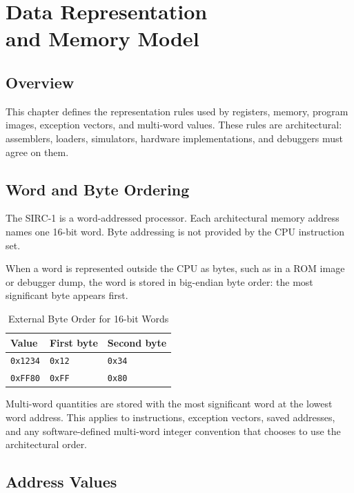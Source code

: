 \chapter[Data Representation and Memory Model]{Data Representation\\and Memory Model}
\label{ch:data-representation}

\section{Overview}

This chapter defines the representation rules used by registers, memory, program images, exception vectors, and
multi-word values. These rules are architectural: assemblers, loaders, simulators, hardware implementations, and
debuggers must agree on them.

\section{Word and Byte Ordering}

The SIRC-1 is a word-addressed processor. Each architectural memory address names one 16-bit word. Byte addressing is
not provided by the CPU instruction set.

When a word is represented outside the CPU as bytes, such as in a ROM image or debugger dump, the word is stored in
big-endian byte order: the most significant byte appears first.

\begin{table}[H]
	\centering
	\begin{tabular}{lll}
		\toprule
		\textbf{Value}  & \textbf{First byte} & \textbf{Second byte} \\
		\midrule
		\texttt{0x1234} & \texttt{0x12}       & \texttt{0x34}        \\
		\texttt{0xFF80} & \texttt{0xFF}       & \texttt{0x80}        \\
		\bottomrule
	\end{tabular}
	\caption{External Byte Order for 16-bit Words}
	\label{tab:external-byte-order}
\end{table}

Multi-word quantities are stored with the most significant word at the lowest word address. This applies to
instructions, exception vectors, saved addresses, and any software-defined multi-word integer convention that chooses
to use the architectural order.

\section{Address Values}
\label{sec:address-values}

